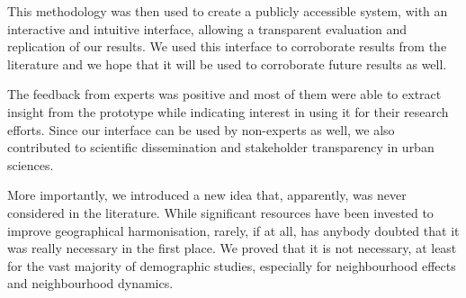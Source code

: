 \documentclass[10pt,letterpaper]{article}
\newcommand{\censure}[1]{}
\begin{document}
This methodology was then used to create a publicly accessible system, with an
interactive and intuitive interface, allowing a transparent evaluation and
replication of our results. We used this interface to corroborate results from
the literature and we hope that it will be used to corroborate future results as
well. 

The feedback from experts was positive and most of them were able to extract
insight from the prototype while indicating interest in using it for their
research efforts.  Since our interface can be used by non-experts as well, we
also contributed to scientific dissemination and stakeholder transparency in
urban sciences.


More importantly, we introduced a new idea that, apparently, was never
considered in the literature. While significant resources have been invested to
improve geographical harmonisation, rarely, if at all, has anybody doubted that
it was really necessary in the first place. We proved that it is not necessary,
at least for the vast majority of demographic studies, especially for
neighbourhood effects and neighbourhood dynamics.

\censure{
\section*{Acknowledgement}
This research was supported by a University of Toronto Connaught Global
Challenge grant and is part of the Urban Genome Project. The authors thank Cary
Wu, Ethan Fosse, Fernando Calderón Figueroa, Patrick Adler, and James Murdoch
for their expert opinions; Mark S. Fox, Robert M. Wright, Ultan Byrne, Matti
Siemiatycki, Shauna Brail, Jeff Allen, Steven Farber, and Richard Florida for
general guidance and support; and the anonymous reviewers for their constructive
comments.}



\end{document}

